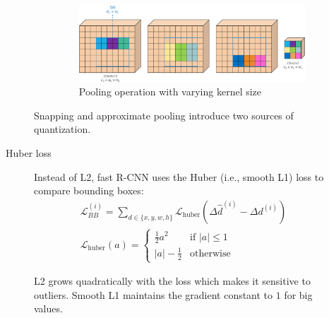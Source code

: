 \begin{description}
\begin{description}
\begin{enumerate}
\begin{figure}[H]
                            \includegraphics[width=0.85\linewidth]{./img/_roipool_maxpool.pdf}
                            \caption{Pooling operation with varying kernel size}
                        \end{figure}
                \end{enumerate}

                \begin{remark}
                    Snapping and approximate pooling introduce two sources of quantization.
                \end{remark}

            \item[Huber loss] 
                Instead of L2, fast R-CNN uses the Huber (i.e., smooth L1) loss to compare bounding boxes:
                \[ 
                    \begin{gathered}
                        \mathcal{L}_{BB}^{(i)} = \sum_{d \in \{ x, y, w, h \}} \mathcal{L}_\text{huber}\left( \Delta\hat{d}^{(i)} - \Delta d^{(i)} \right) \\
                        \mathcal{L}_\text{huber}(a) = \begin{cases}
                            \frac{1}{2}a^2 & \text{if $|a| \leq 1$} \\
                            |a| - \frac{1}{2} & \text{otherwise}
                        \end{cases}
                    \end{gathered}
                \]

                \begin{remark}
                    L2 grows quadratically with the loss which makes it sensitive to outliers. Smooth L1 maintains the gradient constant to $1$ for big values.
                \end{remark}
        \end{description}


\end{description}
